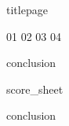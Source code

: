 \documentclass[a4paper,12pt]{article}
\begin{document}
{titlepage}
\clearpage
  \setcounter{page}{2}
  \tableofcontents
\clearpage

{01}
{02}
{03}
{04}

\clearpage
  {conclusion}
\clearpage

\clearpage
  {score_sheet}
\clearpage

\clearpage
  {conclusion}
\clearpage
\end{document}
